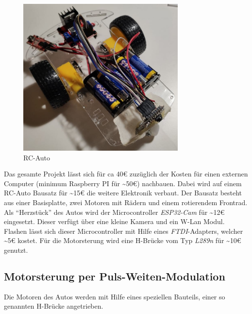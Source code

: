 \documentclass{article}
\begin{document}
\begin{figure}[H]
  \begin{center}
    \includegraphics[width=0.75\textwidth]{auto}
    \caption{RC-Auto}
  \end{center}
\end{figure}

Das gesamte Projekt lässt sich für ca 40€ zuzüglich der Kosten für einen externen Computer (minimum Raspberry PI für \textasciitilde50€) nachbauen.
Dabei wird auf einem RC-Auto Bausatz für \textasciitilde15€ die weitere Elektronik verbaut. Der Bausatz besteht aus einer Basisplatte,
zwei Motoren mit Rädern und einem rotierendem Frontrad. Als \enquote{Herzstück} des Autos wird der Microcontroller
\textit{ESP32-Cam} für \textasciitilde12€ eingesetzt. Dieser verfügt über eine kleine Kamera
und ein W-Lan Modul. Flashen lässt sich dieser Microcontroller mit Hilfe eines \textit{FTDI}-Adapters,
welcher \textasciitilde5€ kostet. Für die Motorsterung wird eine H-Brücke vom Typ \textit{L289n} für \textasciitilde10€ genutzt.

\subsection{Motorsterung per Puls-Weiten-Modulation}

Die Motoren des Autos werden mit Hilfe eines speziellen Bauteils, einer so genannten H-Brücke angetrieben.
\end{document}
